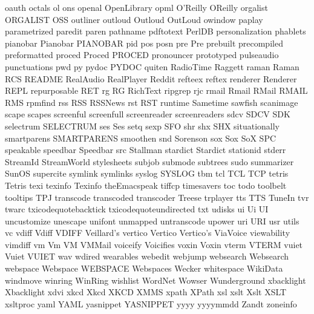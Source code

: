 oauth
octals
ol
ons
openal
OpenLibrary
opml
O'Reilly
OReilly
orgalist
ORGALIST
OSS
outliner
outloud
Outloud
OutLoud
owindow
paplay
parametrized
paredit
paren
pathname
pdftotext
PerlDB
personalization
phablets
pianobar
Pianobar
PIANOBAR
pid
pos
posn
pre
Pre
prebuilt
precompiled
preformatted
proced
Proced
PROCED
pronouncer
prototyped
pulseaudio
punctuations
pwd
py
pydoc
PYDOC
quiten
RadioTime
Raggett
raman
Raman
RCS
README
RealAudio
RealPlayer
Reddit
refteex
reftex
renderer
Renderer
REPL
repurposable
RET
rg
RG
RichText
ripgrep
rjc
rmail
Rmail
RMail
RMAIL
RMS
rpmfind
rss
RSS
RSSNews
rst
RST
runtime
Sametime
sawfish
scanimage
scape
scapes
screenful
screenfull
screenreader
screenreaders
sdcv
SDCV
SDK
selectrum
SELECTRUM
ses
Ses
setq
sexp
SFO
shr
shx
SHX
situationally
smartparens
SMARTPARENS
smoothen
snd
Sorenson
sox
Sox
SoX
SPC
speakable
speedbar
Speedbar
src
Stallman
stardict
Stardict
stationid
stderr
StreamId
StreamWorld
stylesheets
subjob
submode
subtrees
sudo
summarizer
SunOS
supercite
symlink
symlinks
syslog
SYSLOG
tbm
tcl
TCL
TCP
tetris
Tetris
texi
texinfo
Texinfo
theEmacspeak
tiffcp
timesavers
toc
todo
toolbelt
tooltips
TPJ
transcode
transcoded
transcoder
Treese
trplayer
tts
TTS
TuneIn
tvr
twarc
txicodequotebacktick
txicodequoteundirected
txt
udisks
ui
Ui
UI
uncustomize
unescape
unifont
unmapped
untranscode
upower
uri
URI
usr
utils
vc
vdiff
Vdiff
VDIFF
Veillard's
vertico
Vertico
Vertico's
ViaVoice
viewability
vimdiff
vm
Vm
VM
VMMail
voiceify
Voicifies
voxin
Voxin
vterm
VTERM
vuiet
Vuiet
VUIET
wav
wdired
wearables
webedit
webjump
websearch
Websearch
webspace
Webspace
WEBSPACE
Webspaces
Wecker
whitespace
WikiData
windmove
winring
WinRing
wishlist
WordNet
Wowser
Wunderground
xbacklight
Xbacklight
xdvi
xkcd
Xkcd
XKCD
XMMS
xpath
XPath
xsl
xslt
Xslt
XSLT
xsltproc
yaml
YAML
yasnippet
YASNIPPET
yyyy
yyyymmdd
Zandt
zoneinfo
